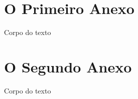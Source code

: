 \documentclass[
        oneside,      %
        english,			
        brazil			 
        ]{configcefetmglpd}
\begin{document}
\begin{anexos}

\chapter{\anexoseq O Primeiro Anexo} 

Corpo do texto



\chapter{\anexoseq O Segundo Anexo} 

Corpo do texto
  
\end{anexos}


\end{document}
